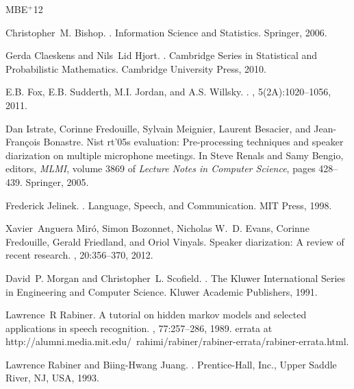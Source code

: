 \newcommand{\etalchar}[1]{$^{#1}$}
\begin{thebibliography}{MBE{\etalchar{+}}12}

Christopher~M. Bishop.
.
\newblock Information Science and Statistics. Springer, 2006.

Gerda Claeskens and Nils~Lid Hjort.
.
\newblock Cambridge Series in Statistical and Probabilistic Mathematics.
  Cambridge University Press, 2010.

E.B. Fox, E.B. Sudderth, M.I. Jordan, and A.S. Willsky.
.
, 5(2A):1020--1056, 2011.

\bibitem[IFM{\etalchar{+}}05]{Istrate2005}
Dan Istrate, Corinne Fredouille, Sylvain Meignier, Laurent Besacier, and
  Jean-François Bonastre.
\newblock Nist rt'05s evaluation: Pre-processing techniques and speaker
  diarization on multiple microphone meetings.
\newblock In Steve Renals and Samy Bengio, editors, {\em MLMI}, volume 3869 of
  {\em Lecture Notes in Computer Science}, pages 428--439. Springer, 2005.

Frederick Jelinek.
.
\newblock Language, Speech, and Communication. MIT Press, 1998.

\bibitem[MBE{\etalchar{+}}12]{Miro2012}
Xavier~Anguera Miró, Simon Bozonnet, Nicholas W.~D. Evans, Corinne Fredouille,
  Gerald Friedland, and Oriol Vinyals.
\newblock Speaker diarization: A review of recent research.
,
  20:356--370, 2012.

David~P. Morgan and Christopher~L. Scofield.
.
\newblock The Kluwer International Series in Engineering and Computer Science.
  Kluwer Academic Publishers, 1991.

Lawrence~R Rabiner.
\newblock A tutorial on hidden markov models and selected applications in
  speech recognition.
, 77:257--286, 1989.
\newblock errata at
  http://alumni.media.mit.edu/~rahimi/rabiner/rabiner-errata/rabiner-errata.html.

Lawrence Rabiner and Biing-Hwang Juang.
.
\newblock Prentice-Hall, Inc., Upper Saddle River, NJ, USA, 1993.


\end{thebibliography}
